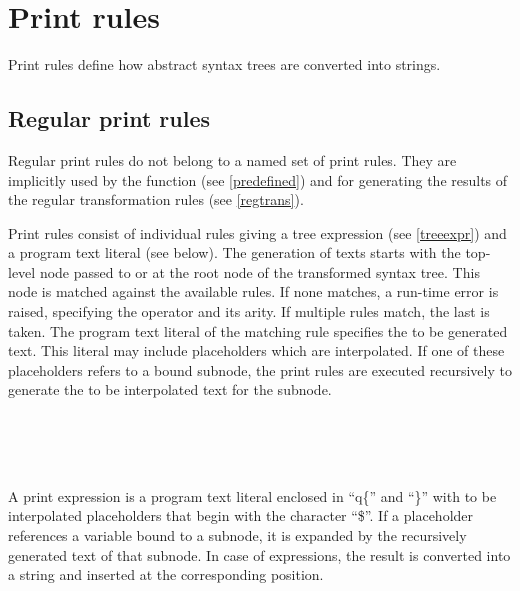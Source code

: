 \chapter{Print rules}\label{print}

Print rules define how abstract syntax trees are converted into
strings.

\section{Regular print rules}\label{regprint}

Regular print rules do not belong to a named set of print rules.
They are implicitly used by the  function
(see \ref{predefined}) and for generating the results of the regular
transformation rules (see \ref{regtrans}).

Print rules consist of
individual rules giving a tree expression (see \ref{treeexpr}) and a
program text literal (see below). The generation of texts starts with
the top-level node passed to  or at the root node of
the transformed syntax tree. This node is matched
against the available rules. If none matches, a run-time error is
raised, specifying the operator and its arity. If multiple rules
match, the last is taken. The program text literal of the matching
rule specifies the to be generated text. This literal may include
placeholders which are interpolated. If one of these placeholders refers
to a bound subnode, the print rules are executed recursively to generate
the to be interpolated text for the subnode.

\begin{grammar}
      \produces {} 
	 \lextoken{\{} 
	 \lextoken{\}} \\
      \produces {} \\
      \produces {}
	  \\
      \produces {}
	 \lextoken{->} 
\end{grammar}

\noindent
A print expression is a program text literal enclosed in ``q\{'' and
``\}'' with to be interpolated placeholders that begin with the character
``\$''.  If a placeholder references a variable bound to a subnode, it
is expanded by the recursively generated text of that subnode.  In case
of expressions, the result is converted into a string and inserted at
the corresponding position.

